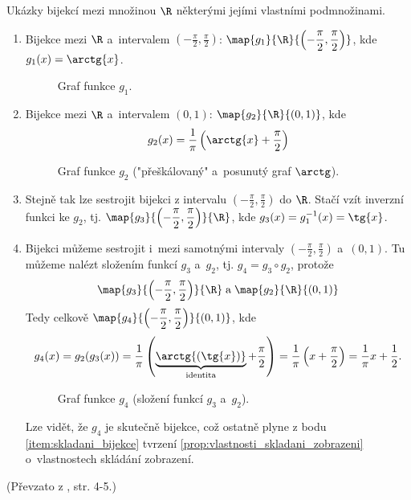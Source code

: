 \begin{example}\label{ex:bijekce_realna_cisla}
    Ukázky bijekcí mezi množinou $\R$ některými jejími vlastními podmnožinami.
    \begin{enumerate}[label=(\roman*)]
        \item\label{item:funkce_arctg} Bijekce mezi $\R$ a~intervalem $\displaystyle\left(-\frac{\pi}{2},\frac{\pi}{2}\right)$: $\displaystyle\map{g_1}{\R}{\left(-\frac{\pi}{2},\frac{\pi}{2}\right)}$, kde $g_1(x)=\arctg{x}$.
        \begin{figure}[H]
            \centering
            
            \caption{Graf funkce $g_1$.}
            \label{fig:graf_g1}
        \end{figure}
        \item\label{item:bijekce_0_a_1} Bijekce mezi $\R$ a~intervalem $(0,1)$: $\map{g_2}{\R}{(0,1)}$, kde
        \begin{equation*}
            g_2(x)=\frac{1}{\pi}\left(\arctg{x}+\frac{\pi}{2}\right)
        \end{equation*}
        \begin{figure}[H]
            \centering
            
            \caption{Graf funkce $g_2$ ("přeškálovaný" a~posunutý graf $\arctg$).}
            \label{fig:graf_g2}
        \end{figure}
        \item\label{item:funkce_tg} Stejně tak lze sestrojit bijekci z intervalu $\displaystyle\left(-\frac{\pi}{2},\frac{\pi}{2}\right)$ do $\R$. Stačí vzít inverzní funkci ke $g_2$, tj. $\displaystyle\map{g_3}{\left(-\frac{\pi}{2},\frac{\pi}{2}\right)}{\R}$, kde $g_3(x)=g_1^{-1}(x)=\tg{x}$.
        \item\label{item:bijekce_slozena} Bijekci můžeme sestrojit i~mezi samotnými intervaly $\displaystyle\left(-\frac{\pi}{2},\frac{\pi}{2}\right)$ a~$(0,1)$. Tu můžeme nalézt složením funkcí $g_3$ a~$g_2$, tj. $g_4=g_3\circ g_2$, protože
        \begin{equation*}
            \map{g_3}{\left(-\frac{\pi}{2},\frac{\pi}{2}\right)}{\R}\;\text{a}\;\map{g_2}{\R}{(0,1)}
        \end{equation*}
        Tedy celkově $\displaystyle\map{g_4}{\left(-\frac{\pi}{2},\frac{\pi}{2}\right)}{(0,1)}$, kde
        \begin{equation*}
            g_4(x)=g_2(g_3(x))=\frac{1}{\pi}\left(\underbrace{\arctg{(\tg{x})}}_{\text{identita}}+\frac{\pi}{2}\right)=\frac{1}{\pi}\left(x+\frac{\pi}{2}\right)=\frac{1}{\pi}x+\frac{1}{2}.
        \end{equation*}
        \begin{figure}[H]
            \centering
            
            \caption{Graf funkce $g_4$ (složení funkcí $g_3$ a~$g_2$).}
            \label{fig:graf_g4}
        \end{figure}
        Lze vidět, že $g_4$ je skutečně bijekce, což ostatně plyne z bodu \ref{item:skladani_bijekce} tvrzení \ref{prop:vlastnosti_skladani_zobrazeni} o~vlastnostech skládání zobrazení.
    \end{enumerate}
\end{example}
(Převzato z \cite{Rmoutil2022}, str. 4-5.)